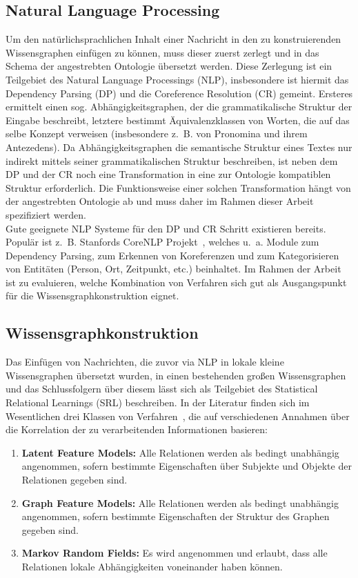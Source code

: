 \documentclass[11pt, a4paper]{scrreprt}
\begin{document}
\subsection{Natural Language Processing}

Um den natürlichsprachlichen Inhalt einer Nachricht in den zu konstruierenden Wissensgraphen einfügen zu können, muss dieser zuerst zerlegt und in das Schema der angestrebten Ontologie übersetzt werden.
Diese Zerlegung ist ein Teilgebiet des Natural Language Processings (NLP), insbesondere ist hiermit das Dependency Parsing (DP) und die Coreference Resolution (CR) gemeint.
Ersteres ermittelt einen sog. Abhängigkeitsgraphen, der die grammatikalische Struktur der Eingabe beschreibt, letztere bestimmt Äquivalenzklassen von Worten, die auf das selbe Konzept verweisen (insbesondere z.~B. von Pronomina und ihrem Antezedens).
Da Abhängigkeitsgraphen die semantische Struktur eines Textes nur indirekt mittels seiner grammatikalischen Struktur beschreiben, ist neben dem DP und der CR noch eine Transformation in eine zur Ontologie kompatiblen Struktur erforderlich.
Die Funktionsweise einer solchen Transformation hängt von der angestrebten Ontologie ab und muss daher im Rahmen dieser Arbeit spezifiziert werden.\\

Gute geeignete NLP Systeme für den DP und CR Schritt existieren bereits.
Populär ist z.~B. Stanfords CoreNLP Projekt~\cite{manning:2014}, welches u.~a. Module zum Dependency Parsing, zum Erkennen von Koreferenzen und zum Kategorisieren von Entitäten (Person, Ort, Zeitpunkt, etc.) beinhaltet.
Im Rahmen der Arbeit ist zu evaluieren, welche Kombination von Verfahren sich gut als Ausgangspunkt für die Wissensgraphkonstruktion eignet.

\subsection{Wissensgraphkonstruktion}

Das Einfügen von Nachrichten, die zuvor via NLP in lokale kleine Wissensgraphen übersetzt wurden, in einen bestehenden großen Wissensgraphen und das Schlussfolgern über diesem lässt sich als Teilgebiet des Statistical Relational Learnings (SRL) beschreiben.
In der Literatur finden sich im Wesentlichen drei Klassen von Verfahren~\cite{nickel:2016}, die auf verschiedenen Annahmen über die Korrelation der zu verarbeitenden Informationen basieren:
\begin{enumerate}
	\item \textbf{Latent Feature Models:}
		Alle Relationen werden als bedingt unabhängig angenommen, sofern bestimmte Eigenschaften über Subjekte und Objekte der Relationen gegeben sind.
	\item \textbf{Graph Feature Models:}
		Alle Relationen werden als bedingt unabhängig angenommen, sofern bestimmte Eigenschaften der Struktur des Graphen gegeben sind.
	\item \textbf{Markov Random Fields:}
		Es wird angenommen und erlaubt, dass alle Relationen lokale Abhängigkeiten voneinander haben können.
\end{enumerate}
\end{document}
